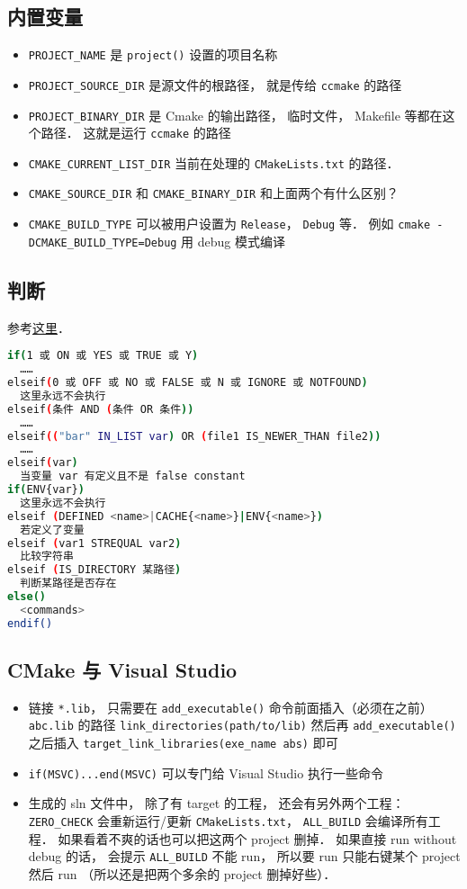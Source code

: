 \subsection{内置变量}
\begin{itemize}
\item \verb|PROJECT_NAME| 是 \verb|project()| 设置的项目名称
\item \verb`PROJECT_SOURCE_DIR` 是源文件的根路径， 就是传给 \verb`ccmake` 的路径
\item \verb`PROJECT_BINARY_DIR` 是 Cmake 的输出路径， 临时文件， Makefile 等都在这个路径． 这就是运行 \verb`ccmake` 的路径
\item \verb|CMAKE_CURRENT_LIST_DIR| 当前在处理的 \verb|CMakeLists.txt| 的路径．
\item \verb|CMAKE_SOURCE_DIR| 和 \verb|CMAKE_BINARY_DIR| 和上面两个有什么区别？
\item \verb|CMAKE_BUILD_TYPE| 可以被用户设置为 \verb|Release|， \verb|Debug| 等． 例如 \verb|cmake -DCMAKE_BUILD_TYPE=Debug| 用 debug 模式编译
\end{itemize}

\subsection{判断}
参考\href{https://cmake.org/cmake/help/latest/command/if.html}{这里}．
\begin{lstlisting}[language=bash]
if(1 或 ON 或 YES 或 TRUE 或 Y)
  ……
elseif(0 或 OFF 或 NO 或 FALSE 或 N 或 IGNORE 或 NOTFOUND)
  这里永远不会执行
elseif(条件 AND (条件 OR 条件))
  ……
elseif(("bar" IN_LIST var) OR (file1 IS_NEWER_THAN file2))
  ……
elseif(var)
  当变量 var 有定义且不是 false constant
if(ENV{var})
  这里永远不会执行
elseif (DEFINED <name>|CACHE{<name>}|ENV{<name>})
  若定义了变量
elseif (var1 STREQUAL var2)
  比较字符串
elseif (IS_DIRECTORY 某路径)
  判断某路径是否存在
else()
  <commands>
endif()
\end{lstlisting}

\subsection{CMake 与 Visual Studio}
\begin{itemize}
\item 链接 \verb`*.lib`， 只需要在 \verb`add_executable()` 命令前面插入（必须在之前） \verb`abc.lib` 的路径 \verb`link_directories(path/to/lib)` 然后再 \verb`add_executable()` 之后插入 \verb`target_link_libraries(exe_name abs)` 即可
\item \verb`if(MSVC)...end(MSVC)` 可以专门给 Visual Studio 执行一些命令
\item 生成的 sln 文件中， 除了有 target 的工程， 还会有另外两个工程： \verb`ZERO_CHECK` 会重新运行/更新 \verb`CMakeLists.txt`， \verb`ALL_BUILD` 会编译所有工程． 如果看着不爽的话也可以把这两个 project 删掉． 如果直接 run without debug 的话， 会提示 \verb`ALL_BUILD` 不能 run， 所以要 run 只能右键某个 project 然后 run （所以还是把两个多余的 project 删掉好些）．
\end{itemize}

